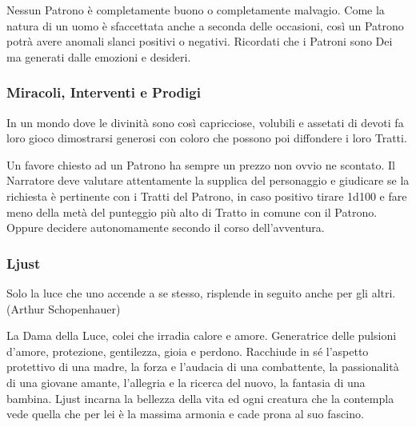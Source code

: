 \begin{multicols}{2}
\medskip

Nessun Patrono è completamente buono o completamente malvagio. Come la natura di un uomo è sfaccettata anche a seconda delle occasioni, così un Patrono potrà avere anomali slanci positivi o negativi. Ricordati che i Patroni sono Dei ma generati dalle emozioni e desideri.

\subsubsection{Miracoli, Interventi e Prodigi}

In un mondo dove le divinità sono così capricciose, volubili e assetati di devoti fa loro gioco dimostrarsi generosi con coloro che possono poi diffondere i loro Tratti.

Un favore chiesto ad un Patrono ha sempre un prezzo non ovvio ne scontato. Il Narratore deve valutare attentamente la supplica del personaggio e giudicare se la richiesta è pertinente con i Tratti del Patrono, in caso positivo tirare 1d100 e fare meno della metà del punteggio più alto di Tratto in comune con il Patrono. Oppure decidere autonomamente secondo il corso dell'avventura.



\subsubsection{Ljust}\label{ljust}\hypertarget{ljust}{}


\begin{enfasi}{
Solo la luce che uno accende a se stesso, risplende in seguito anche per gli altri. (Arthur Schopenhauer)
}\end{enfasi}

La Dama della Luce, colei che irradia calore e amore. Generatrice delle pulsioni d'amore, protezione, gentilezza, gioia e perdono. Racchiude in sé l'aspetto protettivo di una madre, la forza e l'audacia di una combattente, la passionalità di una giovane amante, l'allegria e la ricerca del nuovo, la fantasia di una bambina. Ljust incarna la bellezza della vita ed ogni creatura che la contempla vede quella che per lei è la massima armonia e cade prona al suo fascino.


\end{multicols}
